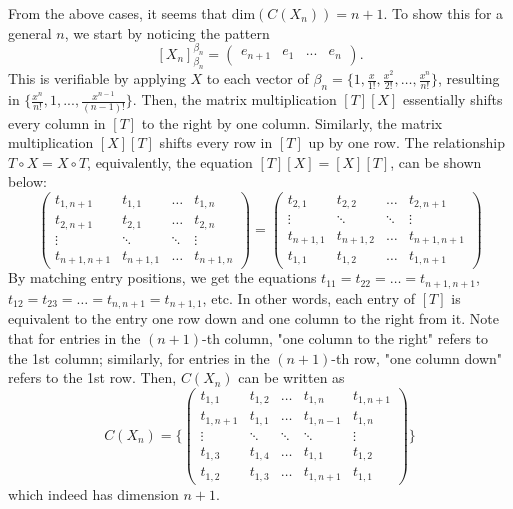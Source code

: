 \documentclass{article}
\begin{document}
\begin{itemize}
	      From the above cases, it seems that $\text{dim}(C(X_n))=n+1$. To show this for a general $n$, we start by noticing the pattern \[[X_n]_{\beta_n}^{\beta_n}=\begin{pmatrix}e_{n+1}&e_1&...&e_n\end{pmatrix}.\]This is verifiable by applying $X$ to each vector of $\beta_n=\{1,\frac{x}{1!},\frac{x^2}{2!},\ldots,\frac{x^n}{n!}\}$, resulting in $\{\frac{x^n}{n!},1,...,\frac{x^{n-1}}{(n-1)!}\}$. Then, the matrix multiplication $[T][X]$ essentially shifts every column in $[T]$ to the right by one column. Similarly, the matrix multiplication $[X][T]$ shifts every row in $[T]$ up by one row. The relationship $T\circ X=X\circ T$, equivalently, the equation $[T][X]=[X][T]$, can be shown below:
	      \[
		      \begin{pmatrix}
			      t_{1,n+1}   & t_{1,1}   & \ldots & t_{1,n}   \\
			      t_{2,n+1}   & t_{2,1}   & \ldots & t_{2,n}   \\
			      \vdots      & \ddots    & \ddots & \vdots    \\
			      t_{n+1,n+1} & t_{n+1,1} & \ldots & t_{n+1,n}
		      \end{pmatrix}=
		      \begin{pmatrix}
			      t_{2,1}   & t_{2,2}   & \ldots & t_{2,n+1}   \\
			      \vdots    & \ddots    & \ddots & \vdots      \\
			      t_{n+1,1} & t_{n+1,2} & \ldots & t_{n+1,n+1} \\
			      t_{1,1}   & t_{1,2}   & \ldots & t_{1,n+1}
		      \end{pmatrix}
	      \]
	      By matching entry positions, we get the equations $t_{11}=t_{22}=\ldots=t_{n+1,n+1}$, $t_{12}=t_{23}=\ldots=t_{n,n+1}=t_{n+1,1}$, etc. In other words, each entry of $[T]$ is equivalent to the entry one row down and one column to the right from it. Note that for entries in the $(n+1)$-th column, "one column to the right" refers to the 1st column; similarly, for entries in the $(n+1)$-th row, "one column down" refers to the 1st row. Then, $C(X_n)$ can be written as
	      \[
		      C(X_n)=\{
		      \begin{pmatrix}
			      t_{1,1}   & t_{1,2} & \ldots & t_{1,n}   & t_{1,n+1} \\
			      t_{1,n+1} & t_{1,1} & \ldots & t_{1,n-1} & t_{1,n}   \\
			      \vdots    & \ddots  & \ddots & \ddots    & \vdots    \\
			      t_{1,3}   & t_{1,4} & \ldots & t_{1,1}   & t_{1,2}   \\
			      t_{1,2}   & t_{1,3} & \ldots & t_{1,n+1} & t_{1,1}
		      \end{pmatrix}
		      \}
	      \]
	      which indeed has dimension $n+1$.
\end{itemize}
\end{document}
